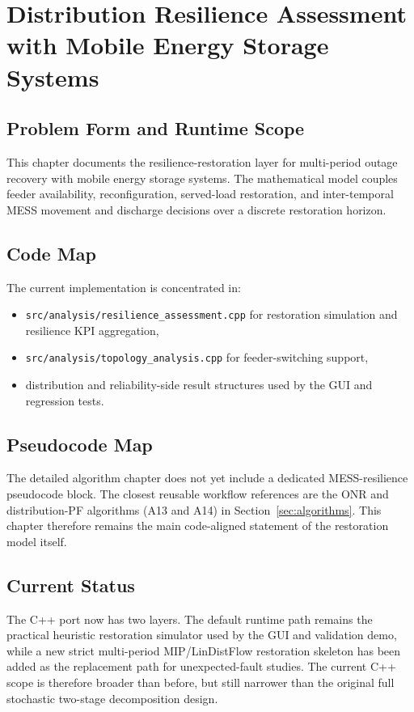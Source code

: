 \section{Distribution Resilience Assessment with Mobile Energy Storage Systems}
\label{sec:distribution-resilience-mess}

\subsection{Problem Form and Runtime Scope}

This chapter documents the resilience-restoration layer for multi-period outage
recovery with mobile energy storage systems.  The mathematical model couples
feeder availability, reconfiguration, served-load restoration, and inter-temporal
MESS movement and discharge decisions over a discrete restoration horizon.

\subsection{Code Map}

The current implementation is concentrated in:
\begin{itemize}
  \item \texttt{src/analysis/resilience\_assessment.cpp} for restoration simulation and resilience KPI aggregation,
  \item \texttt{src/analysis/topology\_analysis.cpp} for feeder-switching support,
  \item distribution and reliability-side result structures used by the GUI and regression tests.
\end{itemize}

\subsection{Pseudocode Map}

The detailed algorithm chapter does not yet include a dedicated MESS-resilience
pseudocode block.  The closest reusable workflow references are the ONR and
distribution-PF algorithms (A13 and A14) in Section~\ref{sec:algorithms}.  This
chapter therefore remains the main code-aligned statement of the restoration
model itself.

\subsection{Current Status}

The C++ port now has two layers. The default runtime path remains the practical
heuristic restoration simulator used by the GUI and validation demo, while a
new strict multi-period MIP/LinDistFlow restoration skeleton has been added as
the replacement path for unexpected-fault studies. The current C++ scope is
therefore broader than before, but still narrower than the original full
stochastic two-stage decomposition design.

